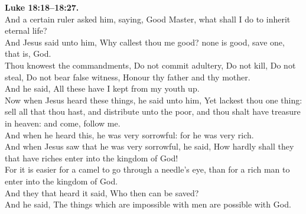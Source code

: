 \documentclass[10pt]{article} %
\begin{document}
{\begin{minipage}[t]{0.45\textwidth}
\textbf{Luke 18:18--18:27.}\\
And a certain ruler asked him, saying, Good Master, what shall I do to inherit eternal life?\\
And Jesus said unto him, Why callest thou me good? none is good, save one, that is, God.\\
Thou knowest the commandments, Do not commit adultery, Do not kill, Do not steal, Do not bear false witness, Honour thy father and thy mother.\\
And he said, All these have I kept from my youth up.\\
Now when Jesus heard these things, he said unto him, Yet lackest thou one thing: sell all that thou hast, and distribute unto the poor, and thou shalt have treasure in heaven: and come, follow me.\\
And when he heard this, he was very sorrowful: for he was very rich.\\
And when Jesus saw that he was very sorrowful, he said, How hardly shall they that have riches enter into the kingdom of God!\\
For it is easier for a camel to go through a needle's eye, than for a rich man to enter into the kingdom of God.\\
And they that heard it said, Who then can be saved?\\
And he said, The things which are impossible with men are possible with God.\\

\end{minipage}}
\vspace*{\fill}
\newpage
\Huge%
\vspace*{\fill}
\begin{spacing}{1.2}
\end{spacing}
\vspace*{\fill}
\end{document}

